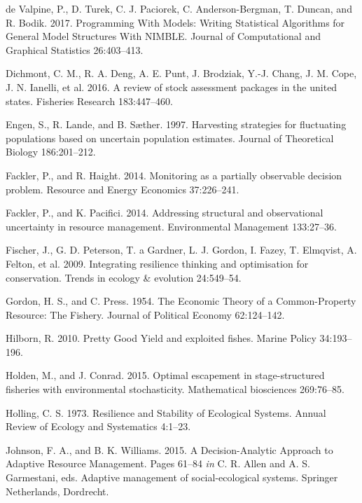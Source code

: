 \documentclass[3p]{elsarticle} %
\begin{document}
\hypertarget{ref-nimble}{}
de Valpine, P., D. Turek, C. J. Paciorek, C. Anderson-Bergman, T.
Duncan, and R. Bodik. 2017. Programming With Models: Writing Statistical
Algorithms for General Model Structures With NIMBLE. Journal of
Computational and Graphical Statistics 26:403--413.

\hypertarget{ref-Dichmont2016}{}
Dichmont, C. M., R. A. Deng, A. E. Punt, J. Brodziak, Y.-J. Chang, J. M.
Cope, J. N. Ianelli, et al. 2016. A review of stock assessment packages
in the united states. Fisheries Research 183:447--460.

\hypertarget{ref-Engen1997}{}
Engen, S., R. Lande, and B. Sæther. 1997. Harvesting strategies for
fluctuating populations based on uncertain population estimates. Journal
of Theoretical Biology 186:201--212.

\hypertarget{ref-Fackler2014b}{}
Fackler, P., and R. Haight. 2014. Monitoring as a partially observable
decision problem. Resource and Energy Economics 37:226--241.

\hypertarget{ref-Fackler2014}{}
Fackler, P., and K. Pacifici. 2014. Addressing structural and
observational uncertainty in resource management. Environmental
Management 133:27--36.

\hypertarget{ref-Fischer2009}{}
Fischer, J., G. D. Peterson, T. a Gardner, L. J. Gordon, I. Fazey, T.
Elmqvist, A. Felton, et al. 2009. Integrating resilience thinking and
optimisation for conservation. Trends in ecology \& evolution
24:549--54.

\hypertarget{ref-Gordon1954}{}
Gordon, H. S., and C. Press. 1954. The Economic Theory of a
Common-Property Resource: The Fishery. Journal of Political Economy
62:124--142.

\hypertarget{ref-Hilborn2010}{}
Hilborn, R. 2010. Pretty Good Yield and exploited fishes. Marine Policy
34:193--196.

\hypertarget{ref-Holden2015}{}
Holden, M., and J. Conrad. 2015. Optimal escapement in stage-structured
fisheries with environmental stochasticity. Mathematical biosciences
269:76--85.

\hypertarget{ref-Holling1973}{}
Holling, C. S. 1973. Resilience and Stability of Ecological Systems.
Annual Review of Ecology and Systematics 4:1--23.

\hypertarget{ref-Johnson2015}{}
Johnson, F. A., and B. K. Williams. 2015. A Decision-Analytic Approach
to Adaptive Resource Management. Pages 61--84 \emph{in} C. R. Allen and
A. S. Garmestani, eds. Adaptive management of social-ecological systems.
Springer Netherlands, Dordrecht.
\end{document}
